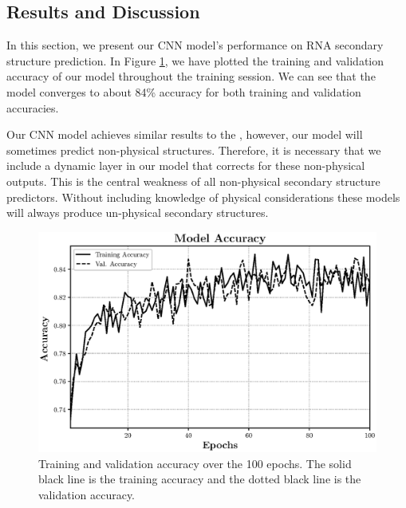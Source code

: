 \documentclass[11pt]{article}
\begin{document}
\begin{multicols}{2}
\subsection{Results and Discussion}
In this section, we present our CNN model's performance on RNA secondary structure prediction. In Figure \ref{fig:acc}, we have plotted the training and validation accuracy of our model throughout the training session. We can see that the model converges to about 84\% accuracy for both training and validation accuracies.

Our CNN model achieves similar results to the \cite{10.3389/fgene.2019.00467}, however, our model will sometimes predict non-physical structures. Therefore, it is necessary that we include a dynamic layer in our model that corrects for these non-physical outputs. This is the central weakness of all non-physical secondary structure predictors. Without including knowledge of physical considerations these models will always produce un-physical secondary structures.

\end{multicols}

\begin{figure}[H]
\centering
\includegraphics[width = \textwidth]{fig/acc}
\caption{Training and validation accuracy over the 100 epochs. The solid black line is the training accuracy and the dotted black line is the validation accuracy.}
\label{fig:acc}
\end{figure}
\end{document}
